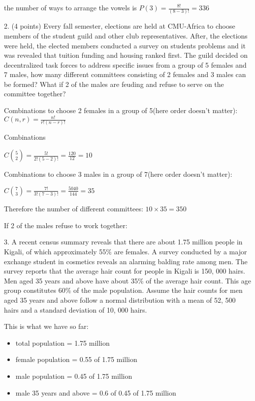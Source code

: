 \documentclass{article}
\begin{document}
the number of ways to arrange the vowels is \(P(3) = \frac{8!}{(8-3)!} = 336\) \newline

2. (4 points) Every fall semester, elections are held at CMU-Africa to choose members of the student
guild and other club representatives. After, the elections were held, the elected members conducted
a survey on students problems and it was revealed that tuition funding and housing ranked first.
The guild decided on decentralized task forces to address specific issues from a group of 5 females
and 7 males, how many different committees consisting of 2 females and 3 males can be formed?
What if 2 of the males are feuding and refuse to serve on the committee together?

Combinations to choose 2 females in a group of 5(here order doesn't matter): \(C(n,r) = \frac{n!}{r!(n-r)!}\)

Combinations

\(C\binom{5}{2} = \frac{5!}{2!(5-2)!} = \frac{120}{12} = 10\)

Combinations to choose 3 males in a group of 7(here order doesn't matter):

\(C\binom{7}{3} = \frac{7!}{3!(7-3)!} = \frac{5040}{144} = 35\)

Therefore the number of different committees: \(10 \times 35 = 350\)\newline

If 2 of the males refuse to work together:


3. A recent census summary reveals that there are about 1.75 million people in Kigali, of which approximately 55\% are females. A survey conducted by a major exchange student in cosmetics reveals an alarming balding rate among men. The survey reports that the average hair count for people in Kigali is 150, 000 hairs. Men aged 35 years and above have about 35\% of the average
hair count. This age group constitutes 60\% of the male population. Assume the hair counts for men aged 35 years and above follow a normal distribution with a mean of 52, 500 hairs and a standard deviation of 10, 000 hairs.

This is what we have so far:

\begin{itemize}
    \item total population = 1.75 million
    \item female population = 0.55 of 1.75 million
    \item male population = 0.45 of 1.75 million
    \item male 35 years and above = 0.6 of 0.45 of 1.75 million
\end{itemize}
\end{document}
